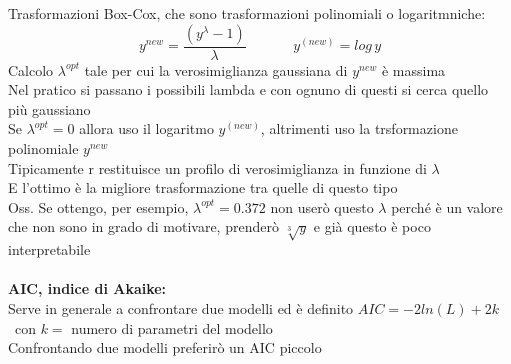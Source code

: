 Trasformazioni Box-Cox, che sono trasformazioni polinomiali o logaritmniche:
\[
y^{new} = \frac{(y^{\lambda}-1)}{\lambda} \hspace{40pt} y^{(new)} = log\,y
\]
Calcolo $\lambda^{opt}$ tale per cui la verosimiglianza gaussiana di $y^{new}$ è massima\\
Nel pratico si passano i possibili lambda e con ognuno di questi si cerca quello più gaussiano\\

Se $\lambda^{opt}=0$ allora uso il logaritmo $y^{(new)}$, altrimenti uso la trsformazione polinomiale $y^{new}$\\

Tipicamente r restituisce un profilo di verosimiglianza in funzione di $\lambda$\\
E l'ottimo è la migliore trasformazione tra quelle di questo tipo\\

Oss. Se ottengo, per esempio, $\lambda^{opt}=0.372$ non userò questo $\lambda$ perché è un valore che non sono in grado di motivare, prenderò $\sqrt[3]{y}$ e già questo è poco interpretabile\\ \\



\textbf{AIC, indice di Akaike:}\\
Serve in generale a confrontare due modelli ed è definito $AIC=-2ln(L)+2k$ \ con $k=$ numero di parametri del modello\\
Confrontando due modelli preferirò un AIC piccolo\\

